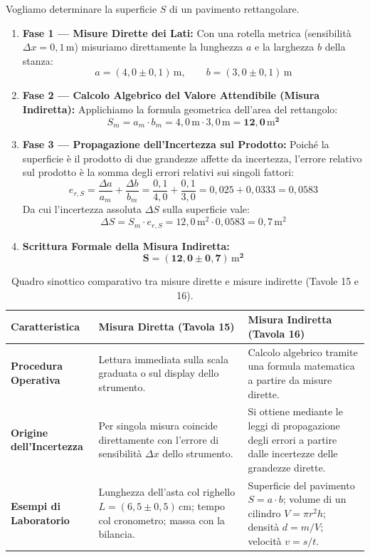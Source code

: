 \documentclass[11pt,a4paper,oneside]{report}
\begin{document}
\begin{metodo}
Vogliamo determinare la superficie $S$ di un pavimento rettangolare.
\begin{enumerate}[leftmargin=2em]
    \item \textbf{Fase 1 — Misure Dirette dei Lati:} Con una rotella metrica (sensibilit\`a $\Delta x = 0{,}1\,\mathrm{m}$) misuriamo direttamente la lunghezza $a$ e la larghezza $b$ della stanza:
    \[
        a = (4{,}0 \pm 0{,}1)\,\mathrm{m}, \qquad b = (3{,}0 \pm 0{,}1)\,\mathrm{m}
    \]
    \item \textbf{Fase 2 — Calcolo Algebrico del Valore Attendibile (Misura Indiretta):} Applichiamo la formula geometrica dell'area del rettangolo:
    \[
        S_m = a_m \cdot b_m = 4{,}0\,\mathrm{m} \cdot 3{,}0\,\mathrm{m} = \mathbf{12{,}0\,\mathrm{m}^2}
    \]
    \item \textbf{Fase 3 — Propagazione dell'Incertezza sul Prodotto:} Poich\'e la superficie \`e il prodotto di due grandezze affette da incertezza, l'errore relativo sul prodotto \`e la somma degli errori relativi sui singoli fattori:
    \[
        e_{r,S} = \frac{\Delta a}{a_m} + \frac{\Delta b}{b_m} = \frac{0{,}1}{4{,}0} + \frac{0{,}1}{3{,}0} = 0{,}025 + 0{,}0333 = 0{,}0583
    \]
    Da cui l'incertezza assoluta $\Delta S$ sulla superficie vale:
    \[
        \Delta S = S_m \cdot e_{r,S} = 12{,}0\,\mathrm{m}^2 \cdot 0{,}0583 = 0{,}7\,\mathrm{m}^2
    \]
    \item \textbf{Scrittura Formale della Misura Indiretta:}
    \[
        \mathbf{\boxed{S = (12{,}0 \pm 0{,}7)\,\mathrm{m}^2}}
    \]
\end{enumerate}
\end{metodo}

\begin{table}[htbp]
\centering
\small
\renewcommand{\arraystretch}{1.35}
\begin{tabularx}{\textwidth}{lXX}
\toprule
\textbf{Caratteristica} & \textbf{Misura Diretta (Tavola 15)} & \textbf{Misura Indiretta (Tavola 16)} \\
\midrule
\textbf{Procedura Operativa} & Lettura immediata sulla scala graduata o sul display dello strumento. & Calcolo algebrico tramite una formula matematica a partire da misure dirette. \\
\textbf{Origine dell'Incertezza} & Per singola misura coincide direttamente con l'errore di sensibilit\`a $\Delta x$ dello strumento. & Si ottiene mediante le leggi di propagazione degli errori a partire dalle incertezze delle grandezze dirette. \\
\textbf{Esempi di Laboratorio} & Lunghezza dell'asta col righello $L = (6{,}5 \pm 0{,}5)\,\mathrm{cm}$; tempo col cronometro; massa con la bilancia. & Superficie del pavimento $S = a \cdot b$; volume di un cilindro $V = \pi r^2 h$; densit\`a $d = m/V$; velocit\`a $v = s/t$. \\
\bottomrule
\end{tabularx}
\caption{Quadro sinottico comparativo tra misure dirette e misure indirette (Tavole 15 e 16).}
\label{tab:confronto_diretta_indiretta}
\end{table}
\end{document}
